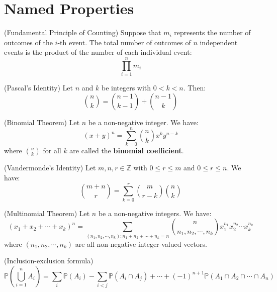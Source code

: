 \documentclass{huhtakm-template-book}
\newcommand{\prob}{\mathbb{P}}
\begin{document}
\section*{Named Properties}
\begin{spro}(Fundamental Principle of Counting)
	Suppose that $m_{i}$ represents the number of outcomes of the $i$-th event. The total number of outcomes of $n$ independent events is the product of the number of each individual event:
	\begin{equation*}
		\prod_{i=1}^{n}m_{i}
	\end{equation*} 
\end{spro}
\begin{spro}(Pascal's Identity)
	Let $n$ and $k$ be integers with $0<k<n$. Then:
	\begin{equation*}
		\binom{n}{k}=\binom{n-1}{k-1}+\binom{n-1}{k}
	\end{equation*}
\end{spro}
\begin{spro}(Binomial Theorem)
	Let $n$ be a non-negative integer. We have:
	\begin{equation*}
		(x+y)^{n}=\sum_{k=0}^{n}\binom{n}{k}x^{k}y^{n-k}
	\end{equation*} 
	where $\binom{n}{k}$ for all $k$ are called the \textbf{binomial coefficient}.
\end{spro}
\begin{spro}(Vandermonde's Identity)
	Let $m,n,r\in\mathbb{Z}$ with $0\leq r\leq m$ and $0\leq r\leq n$. We have:
	\begin{equation*}
		\binom{m+n}{r}=\sum_{k=0}^{r}\binom{m}{r-k}\binom{n}{k}
	\end{equation*}
\end{spro}
\begin{spro}(Multinomial Theorem)
	Let $n$ be a non-negative integers. We have:
	\begin{equation*}
		(x_{1}+x_{2}+\cdots+x_{k})^{n}=\sum_{(n_{1},n_{2},\cdots,n_{k}):n_{1}+n_{2}+\cdots+n_{k}=n}\binom{n}{n_{1},n_{2},\cdots,n_{k}}x_{1}^{n_{1}}x_{2}^{n_{2}}\cdots x_{k}^{n_{k}}
	\end{equation*}
	where $(n_{1},n_{2},\cdots,n_{k})$ are all non-negative integer-valued vectors.
\end{spro}
\begin{spro}(Inclusion-exclusion formula)
	\begin{equation*}
		\prob\left(\bigcup_{i=1}^{n}A_{i}\right)=\sum_{i}\prob(A_{i})-\sum_{i<j}\prob(A_{i}\cap A_{j})+\cdots+(-1)^{n+1}\prob(A_{1}\cap A_{2}\cap\cdots\cap A_{n})
	\end{equation*}
\end{spro}
\end{document}
